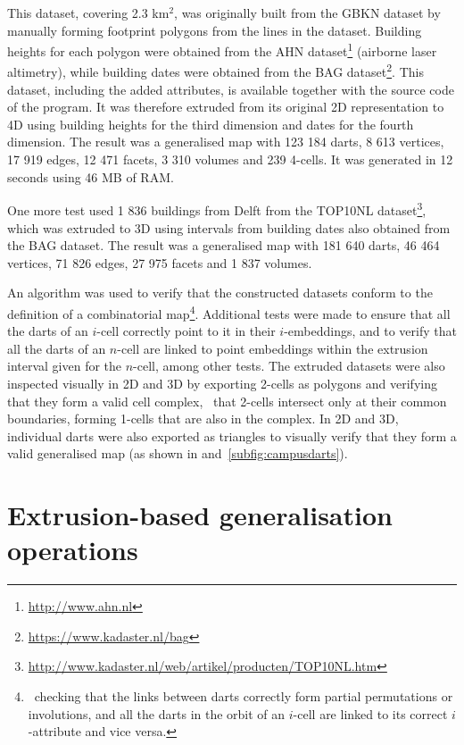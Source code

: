This dataset, covering 2.3 km$^{2}$, was originally built from the GBKN dataset by manually forming footprint polygons from the lines in the dataset.
Building heights for each polygon were obtained from the AHN dataset\footnote{\url{http://www.ahn.nl}} (airborne laser altimetry), while building dates were obtained from the BAG dataset\footnote{\url{https://www.kadaster.nl/bag}}.
This dataset, including the added attributes, is available together with the source code of the program.
It was therefore extruded from its original 2D representation to 4D using building heights for the third dimension and dates for the fourth dimension.
The result was a generalised map with 123 184 darts, 8 613 vertices, 17 919 edges, 12 471 facets, 3 310 volumes and 239 4-cells.
It was generated in 12 seconds using 46 MB of RAM.\@

One more test used 1 836 buildings from Delft from the TOP10NL dataset\footnote{\url{http://www.kadaster.nl/web/artikel/producten/TOP10NL.htm}}, which was extruded to 3D using intervals from building dates also obtained from the BAG dataset.
The result was a generalised map with 181 640 darts, 46 464 vertices, 71 826 edges, 27 975 facets and 1 837 volumes.

An algorithm was used to verify that the constructed datasets conform to the definition of a combinatorial map\footnote{\ie\ checking that the links between darts correctly form partial permutations or involutions, and all the darts in the orbit of an $i$-cell are linked to its correct $i$-attribute and vice versa.}.
Additional tests were made to ensure that all the darts of an $i$-cell correctly point to it in their $i$-embeddings, and to verify that all the darts of an $n$-cell are linked to point embeddings within the extrusion interval given for the $n$-cell, among other tests.
The extruded datasets were also inspected visually in 2D and 3D by exporting 2-cells as polygons and verifying that they form a valid cell complex, \ie\ that 2-cells intersect only at their common boundaries, forming 1-cells that are also in the complex.
In 2D and 3D, individual darts were also exported as triangles to visually verify that they form a valid generalised map (as shown in  and~\ref{subfig:campusdarts}).

\section{Extrusion-based generalisation operations}
\label{se:extrusion-generalisation}

